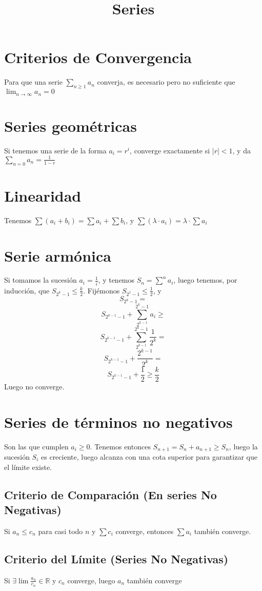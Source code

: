 \documentclass{article}
\title{Series}
\date{}
\author{}
\def\R{\mathbb{R}}
\begin{document}
\maketitle
\section{Criterios de Convergencia}
Para que una serie \(
\sum_{n \ge 1} a_n
\) converja, es necesario pero no suficiente que \(
\lim_{n \to \infty} a_n = 0
\)
\section{Series geométricas}
Si tenemos una serie de la forma $a_i = r^i$, converge exactamente si $|r| <
1$, y da \(
\sum_ {n = 0} a_n = \frac{1}{1 - r}
\)
\section{Linearidad}
Tenemos \(
\sum (a_i + b_i) = \sum a_i + \sum b_i
\), y $\sum (\lambda \cdot a_i) = \lambda \cdot \sum a_i$
\section{Serie armónica}
Si tomamos la sucesión $a_i = \frac{1}{i}$, y tenemos \(
	S_n = \sum^n a_i
\), luego tenemos, por inducción, que $S_{2^k-1} \leq \frac{k}{2}$.
Fijémonos $S_{2^1-1} \leq \frac{1}{2}$, y \[
S_{2^k-1} =
\]\[S_{2^{k-1}-1} + \sum_{2^{k-1}}^{2^k-1} a_i \geq
\]\[
S_{2^{k-1}-1} + \sum_{2^{k-1}}^{2^k-1} \frac{1}{2^k} =
\]\[
S_{2^{k-1}-1} + \frac{2^{k-1}}{2^k} =
\]\[
S_{2^{k-1}-1} + \frac{1}{2} \geq \frac{k}{2}
\]
Luego no converge.

\section{Series de términos no negativos}
Son las que cumplen $a_i \geq 0$.
Tenemos entonces $S_{n+1} = S_{n} + a_{n+1} \geq S_n$, luego la sucesión
$S_i$ es creciente, luego alcanza con una cota superior para garantizar que
el límite existe.
\subsection{Criterio de Comparación (En series No Negativas)}
Si $a_n \leq c_n$ para casi todo $n$ y $\sum c_i$ converge, entonces $\sum
a_i$ también converge.

\subsection{Criterio del Límite (Series No Negativas)}
Si $\exists \lim \frac{a_n}{c_n} \in \R$ y $c_n$ converge, luego $a_n$ también
converge
\end{document}

